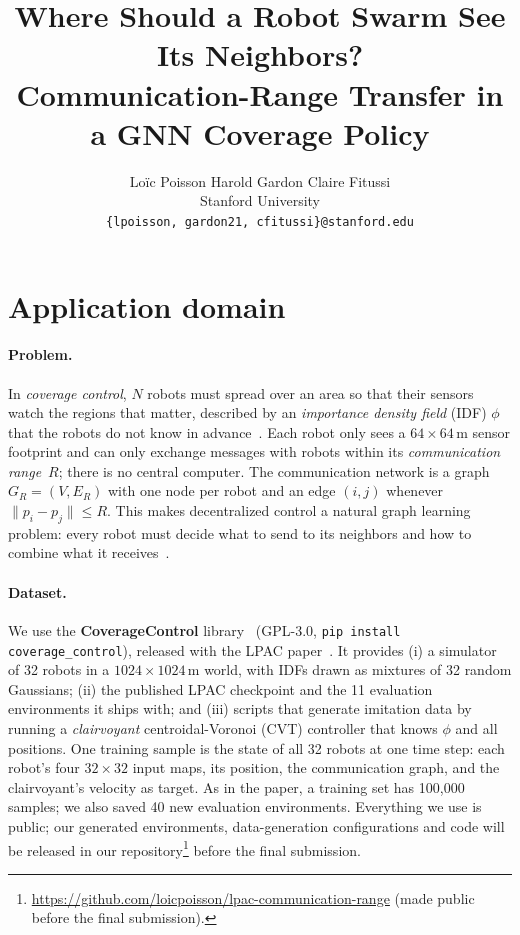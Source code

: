 \documentclass{article}
\title{Where Should a Robot Swarm See Its Neighbors?\\ Communication-Range Transfer in a GNN Coverage Policy}
\author{%
  Lo\"ic Poisson \quad Harold Gardon \quad Claire Fitussi \\
  Stanford University \\
  \texttt{\{lpoisson, gardon21, cfitussi\}@stanford.edu}
}
\begin{document}
\maketitle
\vspace{-1.2em}

\section{Application domain}

\paragraph{Problem.}
In \emph{coverage control}, $N$ robots must spread over an area so that their sensors watch the regions that matter, described by an \emph{importance density field} (IDF) $\phi$ that the robots do not know in advance~\citep{cortes2004coverage}. Each robot only sees a $64\times64$\,m sensor footprint and can only exchange messages with robots within its \emph{communication range}~$R$; there is no central computer. The communication network is a graph $G_R=(V,E_R)$ with one node per robot and an edge $(i,j)$ whenever $\|p_i-p_j\|\le R$. This makes decentralized control a natural graph learning problem: every robot must decide what to send to its neighbors and how to combine what it receives~\citep{tolstaya2019flocking}.

\paragraph{Dataset.}
We use the \textbf{CoverageControl} library~\citep{coveragecontrol} (GPL-3.0, \texttt{pip install coverage\_control}), released with the LPAC paper~\citep{agarwal2025lpac}. It provides (i) a simulator of 32 robots in a $1024\times1024$\,m world, with IDFs drawn as mixtures of 32 random Gaussians; (ii) the published LPAC checkpoint and the 11 evaluation environments it ships with; and (iii) scripts that generate imitation data by running a \emph{clairvoyant} centroidal-Voronoi (CVT) controller that knows $\phi$ and all positions. One training sample is the state of all 32 robots at one time step: each robot's four $32\times32$ input maps, its position, the communication graph, and the clairvoyant's velocity as target. As in the paper, a training set has 100{,}000 samples; we also saved 40 new evaluation environments. Everything we use is public; our generated environments, data-generation configurations and code will be released in our repository\footnote{\url{https://github.com/loicpoisson/lpac-communication-range} (made public before the final submission).} before the final submission.
\end{document}
